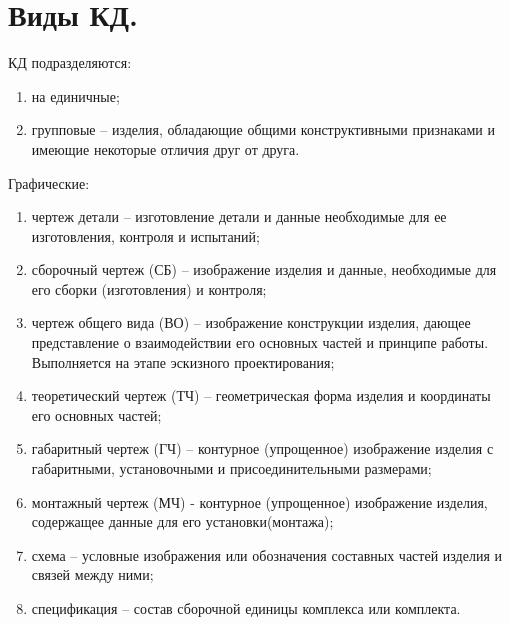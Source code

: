 \documentclass[unicode, 12pt, a4paper, oneside]{article}
\begin{document}

\section{Виды КД.}

КД подразделяются:
\begin{enumerate}
\item на единичные;
\item групповые – изделия, обладающие общими конструктивными признаками и имеющие некоторые отличия друг от друга.
\end{enumerate}

Графические:
\begin{enumerate}
\item чертеж детали – изготовление детали и данные необходимые для ее изготовления, контроля и испытаний;
\item сборочный чертеж (СБ) – изображение изделия и данные, необходимые для его сборки (изготовления) и контроля;
\item чертеж общего вида (ВО) – изображение конструкции изделия, дающее представление о взаимодействии его основных частей и принципе работы. Выполняется на этапе эскизного проектирования;
\item теоретический чертеж (ТЧ) – геометрическая форма изделия и координаты его основных частей;
\item габаритный чертеж (ГЧ) – контурное (упрощенное) изображение изделия с габаритными, установочными и присоединительными размерами;
\item монтажный чертеж (МЧ) - контурное (упрощенное) изображение изделия, содержащее данные для его установки(монтажа);
\item схема – условные изображения или обозначения составных частей изделия и связей между ними;
\item спецификация – состав сборочной единицы комплекса или комплекта.
\end{enumerate}
\end{document}
